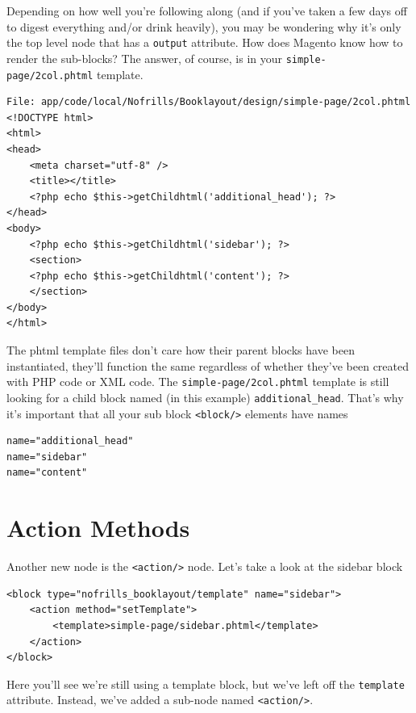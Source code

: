 \documentclass[oneside]{book}
\begin{document}
Depending on how well you're following along (and if you've taken a few days off to digest everything and/or drink heavily), you may be wondering why it's only the top level node that has a \footnotesize\texttt{output} \normalsize  attribute.  How does Magento know how to render the sub-blocks?  The answer, of course, is in your \footnotesize\texttt{simple-page/2col.phtml} \normalsize  template.  

\begin{lstlisting}
File: app/code/local/Nofrills/Booklayout/design/simple-page/2col.phtml
<!DOCTYPE html>
<html>
<head>
    <meta charset="utf-8" />
    <title></title>
    <?php echo $this->getChildhtml('additional_head'); ?>
</head>
<body>
    <?php echo $this->getChildhtml('sidebar'); ?>
    <section>
    <?php echo $this->getChildhtml('content'); ?>
    </section>
</body>
</html>

\end{lstlisting}


The phtml template files don't care how their parent blocks have been instantiated, they'll function the same regardless of whether they've been created with PHP code or XML code.  The \footnotesize\texttt{simple-page/2col.phtml} \normalsize  template is still looking for a child block named (in this example) \footnotesize\texttt{additional\_head}\normalsize.  That's why it's important that all your sub block  \footnotesize\texttt{\textless block/\textgreater } \normalsize  elements have names

\begin{lstlisting}
name="additional_head"
name="sidebar"
name="content"

\end{lstlisting}


\section{Action Methods}

Another new node is the \footnotesize\texttt{\textless action/\textgreater } \normalsize  node.  Let's take a look at the sidebar block

\begin{lstlisting}
<block type="nofrills_booklayout/template" name="sidebar">
    <action method="setTemplate">
        <template>simple-page/sidebar.phtml</template>
    </action>
</block>

\end{lstlisting}


Here you'll see we're still using a template block, but we've left off the \footnotesize\texttt{template} \normalsize  attribute.  Instead, we've added a sub-node named \footnotesize\texttt{\textless action/\textgreater }\normalsize.
\end{document}
